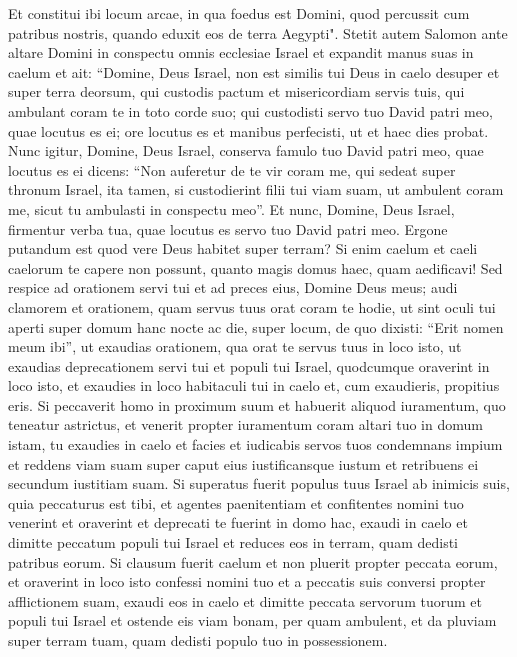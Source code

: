 \begin{biblechapter}
\verse Et constitui ibi locum arcae, in qua foedus est Domini, quod percussit cum patribus nostris, quando eduxit eos de terra Aegypti". 
\verse Stetit autem Salomon ante altare Domini in conspectu omnis ecclesiae Israel et expandit manus suas in caelum 
\verse et ait: “Domine, Deus Israel, non est similis tui Deus in caelo desuper et super terra deorsum, qui custodis pactum et misericordiam servis tuis, qui ambulant coram te in toto corde suo; 
\verse qui custodisti servo tuo David patri meo, quae locutus es ei; ore locutus es et manibus perfecisti, ut et haec dies probat. 
\verse Nunc igitur, Domine, Deus Israel, conserva famulo tuo David patri meo, quae locutus es ei dicens: “Non auferetur de te vir coram me, qui sedeat super thronum Israel, ita tamen, si custodierint filii tui viam suam, ut ambulent coram me, sicut tu ambulasti in conspectu meo”. 
\verse Et nunc, Domine, Deus Israel, firmentur verba tua, quae locutus es servo tuo David patri meo. 
\verse Ergone putandum est quod vere Deus habitet super terram? Si enim caelum et caeli caelorum te capere non possunt, quanto magis domus haec, quam aedificavi! 
\verse Sed respice ad orationem servi tui et ad preces eius, Domine Deus meus; audi clamorem et orationem, quam servus tuus orat coram te hodie, 
\verse ut sint oculi tui aperti super domum hanc nocte ac die, super locum, de quo dixisti: “Erit nomen meum ibi”, ut exaudias orationem, qua orat te servus tuus in loco isto, 
\verse ut exaudias deprecationem servi tui et populi tui Israel, quodcumque oraverint in loco isto, et exaudies in loco habitaculi tui in caelo et, cum exaudieris, propitius eris. 
\verse Si peccaverit homo in proximum suum et habuerit aliquod iuramentum, quo teneatur astrictus, et venerit propter iuramentum coram altari tuo in domum istam, 
\verse tu exaudies in caelo et facies et iudicabis servos tuos condemnans impium et reddens viam suam super caput eius iustificansque iustum et retribuens ei secundum iustitiam suam. 
\verse Si superatus fuerit populus tuus Israel ab inimicis suis, quia peccaturus est tibi, et agentes paenitentiam et confitentes nomini tuo venerint et oraverint et deprecati te fuerint in domo hac, 
\verse exaudi in caelo et dimitte peccatum populi tui Israel et reduces eos in terram, quam dedisti patribus eorum. 
\verse Si clausum fuerit caelum et non pluerit propter peccata eorum, et oraverint in loco isto confessi nomini tuo et a peccatis suis conversi propter afflictionem suam, 
\verse exaudi eos in caelo et dimitte peccata servorum tuorum et populi tui Israel et ostende eis viam bonam, per quam ambulent, et da pluviam super terram tuam, quam dedisti populo tuo in possessionem. 

\end{biblechapter}

